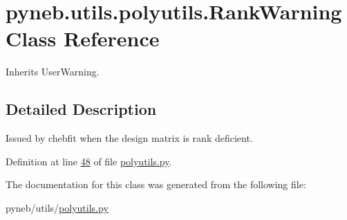 \hypertarget{classpyneb_1_1utils_1_1polyutils_1_1_rank_warning}{\section{pyneb.\-utils.\-polyutils.\-Rank\-Warning Class Reference}
\label{classpyneb_1_1utils_1_1polyutils_1_1_rank_warning}
}


Inherits User\-Warning.



\subsection{Detailed Description}
\begin{DoxyVerb}Issued by chebfit when the design matrix is rank deficient.\end{DoxyVerb}
 

Definition at line \hyperlink{polyutils_8py_source_l00048}{48} of file \hyperlink{polyutils_8py_source}{polyutils.\-py}.



The documentation for this class was generated from the following file\-:\begin{DoxyCompactItemize}
\item 
pyneb/utils/\hyperlink{polyutils_8py}{polyutils.\-py}\end{DoxyCompactItemize}
